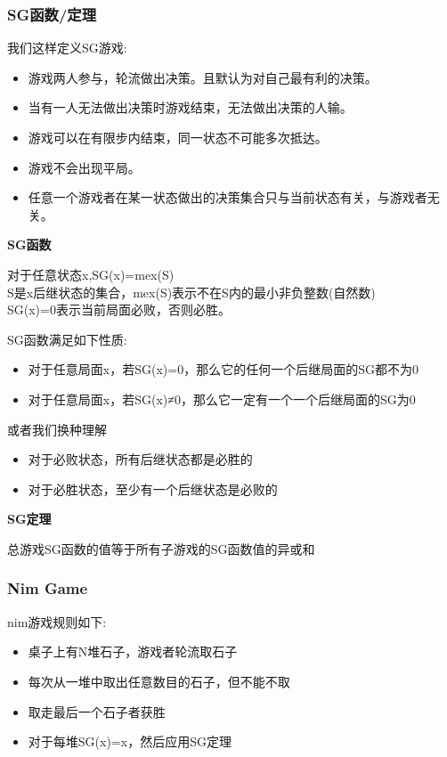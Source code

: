 \documentclass{article}
\begin{document}
\subsubsection{SG函数/定理}

我们这样定义SG游戏:
\begin{itemize}
\item 游戏两人参与，轮流做出决策。且默认为对自己最有利的决策。
\item 当有一人无法做出决策时游戏结束，无法做出决策的人输。
\item 游戏可以在有限步内结束，同一状态不可能多次抵达。
\item 游戏不会出现平局。
\item 任意一个游戏者在某一状态做出的决策集合只与当前状态有关，与游戏者无关。
\end{itemize}

\textbf{SG函数}

对于任意状态x,SG(x)=mex(S)	\\
S是x后继状态的集合，mex(S)表示不在S内的最小非负整数(自然数)	\\
SG(x)=0表示当前局面必败，否则必胜。

SG函数满足如下性质:
\begin{itemize}
\item 对于任意局面x，若SG(x)=0，那么它的任何一个后继局面的SG都不为0
\item 对于任意局面x，若SG(x)≠0，那么它一定有一个一个后继局面的SG为0
\end{itemize}

或者我们换种理解
\begin{itemize}
\item 对于必败状态，所有后继状态都是必胜的
\item 对于必胜状态，至少有一个后继状态是必败的
\end{itemize}


\textbf{SG定理}

总游戏SG函数的值等于所有子游戏的SG函数值的异或和

\subsubsection{Nim Game}

nim游戏规则如下:
\begin{itemize}
\item 桌子上有N堆石子，游戏者轮流取石子
\item 每次从一堆中取出任意数目的石子，但不能不取
\item 取走最后一个石子者获胜
\item 对于每堆SG(x)=x，然后应用SG定理
\end{itemize}
\end{document}
